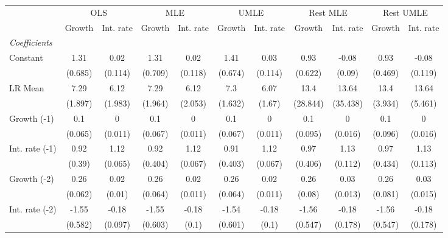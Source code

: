 \begin{table}[htbp] 
	\centering
	\begin{tabular}{@{\extracolsep{4pt}}lcccccccccc@{}}		\hline\hline
		 		 & \multicolumn{2}{c}{OLS} &\multicolumn{2}{c}{MLE} &\multicolumn{2}{c}{UMLE} &\multicolumn{2}{c}{Rest MLE} &\multicolumn{2}{c}{Rest UMLE} \\ 
 		 & Growth 	 & Int. rate 	 & Growth 	 & Int. rate 	 & Growth 	 & Int. rate 	 & Growth 	 & Int. rate 	 & Growth 	 & Int. rate\\\cline{2-3}\cline{4-5}\cline{6-7}\cline{8-9}\cline{10-11}
\rule{0pt}{4ex} 
 \emph{Coefficients} 	  		 & 		 & 		 & 		 & 		 & 		 & 		 & 		 & 		 & 		 &\\ 
\quad Constant 	 & 1.31 	 & 0.02 	 & 1.31 	 & 0.02 	 & 1.41 	 & 0.03 	 & 0.93 	 & -0.08 	 & 0.93 	 & -0.08	 \\ 
 		 & (0.685) 	 & (0.114) 	 & (0.709) 	 & (0.118) 	 & (0.674) 	 & (0.114) 	 & (0.622) 	 & (0.09) 	 & (0.469) 	 & (0.119) 	 \\ 
\quad LR Mean 	 & 7.29 	 & 6.12 	 & 7.29 	 & 6.12 	 & 7.3 	 & 6.07 	 & 13.4 	 & 13.64 	 & 13.4 	 & 13.64	 \\ 
 		 & (1.897) 	 & (1.983) 	 & (1.964) 	 & (2.053) 	 & (1.632) 	 & (1.67) 	 & (28.844) 	 & (35.438) 	 & (3.934) 	 & (5.461) 	 \\ 
\quad Growth (-1) 	 &0.1 	 & 0 	 & 0.1 	 & 0 	 & 0.1 	 & 0 	 & 0.1 	 & 0 	 & 0.1 	 & 0	 \\ 
 		 & (0.065) 	 & (0.011) 	 & (0.067) 	 & (0.011) 	 & (0.067) 	 & (0.011) 	 & (0.095) 	 & (0.016) 	 & (0.096) 	 & (0.016) 	 \\ 
\quad Int. rate (-1) 	 &0.92 	 & 1.12 	 & 0.92 	 & 1.12 	 & 0.91 	 & 1.12 	 & 0.97 	 & 1.13 	 & 0.97 	 & 1.13	 \\ 
 		 & (0.39) 	 & (0.065) 	 & (0.404) 	 & (0.067) 	 & (0.403) 	 & (0.067) 	 & (0.406) 	 & (0.112) 	 & (0.434) 	 & (0.113) 	 \\ 
\quad Growth (-2) 	 &0.26 	 & 0.02 	 & 0.26 	 & 0.02 	 & 0.26 	 & 0.02 	 & 0.26 	 & 0.03 	 & 0.26 	 & 0.03	 \\ 
 		 & (0.062) 	 & (0.01) 	 & (0.064) 	 & (0.011) 	 & (0.064) 	 & (0.011) 	 & (0.08) 	 & (0.013) 	 & (0.081) 	 & (0.015) 	 \\ 
\quad Int. rate (-2) 	 &-1.55 	 & -0.18 	 & -1.55 	 & -0.18 	 & -1.54 	 & -0.18 	 & -1.56 	 & -0.18 	 & -1.56 	 & -0.18	 \\ 
 		 & (0.582) 	 & (0.097) 	 & (0.603) 	 & (0.1) 	 & (0.601) 	 & (0.1) 	 & (0.547) 	 & (0.178) 	 & (0.547) 	 & (0.178) 	 \\ 

\end{tabular}
\end{table}
